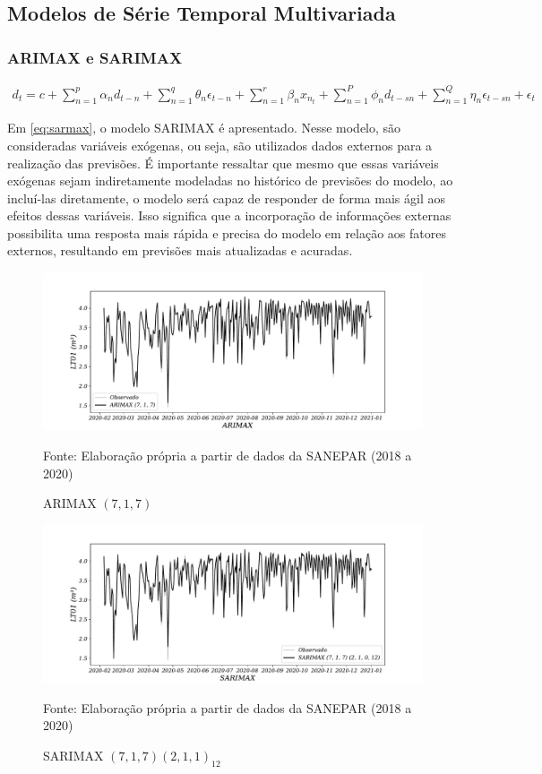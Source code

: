 \subsection{Modelos de S\'erie Temporal Multivariada}\label{subsec:mult}

\subsubsection{ARIMAX e SARIMAX}

\begin{eqnarray}
	d_t=c+\sum_{n=1}^p \alpha_n d_{t-n}+\sum_{n=1}^q \theta_n \epsilon_{t-n}+\sum_{n=1}^r \beta_n x_{n_t}+\sum_{n=1}^P \phi_n d_{t-s n}+\sum_{n=1}^Q \eta_n \epsilon_{t-s n}+\epsilon_t \label{eq:sarmax}
\end{eqnarray}

Em \eqref{eq:sarmax}, o modelo SARIMAX é apresentado. Nesse modelo, são consideradas variáveis exógenas, ou seja, são utilizados dados externos para a realização das previsões. É importante ressaltar que mesmo que essas variáveis exógenas sejam indiretamente modeladas no histórico de previsões do modelo, ao incluí-las diretamente, o modelo será capaz de responder de forma mais ágil aos efeitos dessas variáveis. Isso significa que a incorporação de informações externas possibilita uma resposta mais rápida e precisa do modelo em relação aos fatores externos, resultando em previsões mais atualizadas e acuradas.

\begin{figure}[H]
	\centering
	\caption{ARIMAX $(7,1,7)$  }
	\label{fig:1-arimax}
	\includegraphics[width=0.9\linewidth]{Modelos/Figuras/0-ARIMAX}
	
	Fonte: Elaboração própria a partir de dados da SANEPAR (2018 a 2020)
\end{figure}

\begin{figure}[H]
	\centering
	\caption{SARIMAX $(7,1,7) (2,1,1)_{12}$  }
	\label{fig:1-sarimax}
	\includegraphics[width=0.9\linewidth]{Modelos/Figuras/0-SARIMAX}
	
	Fonte: Elaboração própria a partir de dados da SANEPAR (2018 a 2020)
\end{figure}


